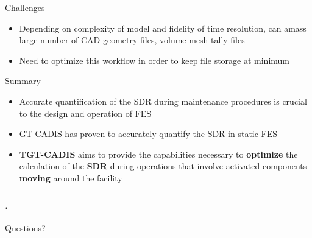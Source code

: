 \documentclass{beamer}
\begin{document}
\begin{frame}{Challenges}
			\begin{itemize}
				\item{Depending on complexity of model and
					fidelity of time resolution, can amass
					large number of CAD geometry files,
					volume mesh tally files}
				\item{Need to optimize this workflow in order
					to keep file storage at minimum}
			\end{itemize}
\end{frame}
\begin{frame}{Summary}
	\begin{itemize}
		\item{Accurate quantification of the SDR during maintenance
			procedures is crucial to the design and operation of
			FES}
		\item{GT-CADIS has proven to accurately quantify the SDR in
			static FES}
\vspace{0.5cm}
		\item{\textbf{TGT-CADIS} aims to provide the capabilities necessary to
			\textbf{optimize} the calculation of the \textbf{SDR}
			during operations that involve activated components
			\textbf{moving} around the facility}
	\end{itemize}
\end{frame}

\begin{frame}[c]
	\frametitle{\tiny{.}}
	\begin{center}
	{\Huge Questions?}
	\end{center}
\end{frame}



\end{document}

